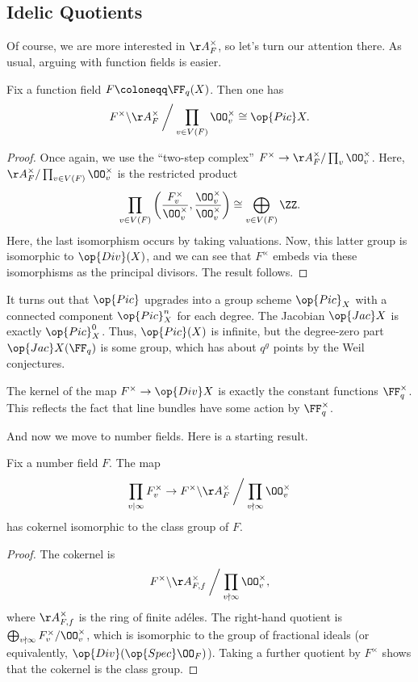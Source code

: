 \documentclass[../notes.tex]{subfiles}
\begin{document}
\subsection{Idelic Quotients}
Of course, we are more interested in $\AA_F^\times$, so let's turn our attention there. As usual, arguing with function fields is easier.
\begin{proposition}
	Fix a function field $F\coloneqq\FF_q(X)$. Then one has
	\[F^\times\backslash\AA_F^\times\mathbin{\bigg/}\prod_{v\in V(F)}\OO_v^\times\cong\op{Pic}X.\]
\end{proposition}
\begin{proof}
	Once again, we use the ``two-step complex'' $F^\times\to\AA_F^\times/\prod_v\OO_v^\times$. Here, $\AA_F^\times/\prod_{v\in V(F)}\OO_v^\times$ is the restricted product
	\[\prod_{v\in V(F)}\left(\frac{F_v^\times}{\OO_v^\times},\frac{\OO_v^\times}{\OO_v^\times}\right)\cong\bigoplus_{v\in V(F)}\ZZ.\]
	Here, the last isomorphism occurs by taking valuations. Now, this latter group is isomorphic to $\op{Div}(X)$, and we can see that $F^\times$ embeds via these isomorphisms as the principal divisors. The result follows.
\end{proof}
\begin{remark}
	It turns out that $\op{Pic}$ upgrades into a group scheme $\op{Pic}_X$ with a connected component $\op{Pic}_X^n$ for each degree. The Jacobian $\op{Jac}X$ is exactly $\op{Pic}_X^0$. Thus, $\op{Pic}(X)$ is infinite, but the degree-zero part $\op{Jac}X(\FF_q)$ is some group, which has about $q^g$ points by the Weil conjectures.
\end{remark}
\begin{remark}
	The kernel of the map $F^\times\to\op{Div}X$ is exactly the constant functions $\FF_q^\times$. This reflects the fact that line bundles have some action by $\FF_q^\times$.
\end{remark}
And now we move to number fields. Here is a starting result.
\begin{lemma}
	Fix a number field $F$. The map
	\[\prod_{v\mid\infty}F_v^\times\to F^\times\backslash\AA_F^\times\mathbin{\bigg/}\prod_{v\nmid\infty}\OO_v^\times\]
	has cokernel isomorphic to the class group of $F$.
\end{lemma}
\begin{proof}
	The cokernel is
	\[F^\times\backslash\AA_{F,f}^\times\mathbin{\bigg/}\prod_{v\nmid\infty}\OO_v^\times,\]
	where $\AA_{F,f}^\times$ is the ring of finite ad\'eles. The right-hand quotient is $\bigoplus_{v\nmid\infty}F_v^\times/\OO_v^\times$, which is isomorphic to the group of fractional ideals (or equivalently, $\op{Div}(\op{Spec}\OO_F)$). Taking a further quotient by $F^\times$ shows that the cokernel is the class group.
\end{proof}
\end{document}
